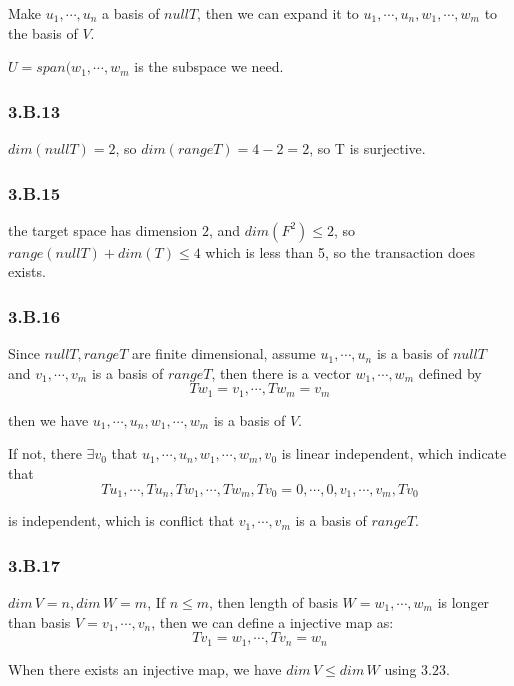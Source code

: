 Make $u_{1}, \cdots, u_{n}$ a basis of $null T$, then we can expand it to $u_{1}, \cdots, u_{n}, w_{1}, \cdots, w_{m}$ to the basis of $V$.

$U=span(w_{1},\cdots, w_{m}$ is the subspace we need.

\subsubsection*{3.B.13}

$dim(null T) = 2$, so $dim(range T) = 4 - 2 = 2$, so T is surjective.

\subsubsection*{3.B.15}

the target space has dimension $2$, and $dim(F^{2}) \leq 2$, so $range(null T) + dim(T) \leq 4$ which is less than 5, so the transaction does exists.

\subsubsection*{3.B.16}

Since $null T, range T$ are finite dimensional, assume $u_{1}, \cdots, u_{n}$ is a basis of $null T$ and $v_{1},\cdots, v_{m}$ is a basis of $range T$, then there is a vector $w_{1},\cdots,w_{m}$ defined by
\[Tw_{1} = v_{1}, \cdots, Tw_{m} = v_{m}\]

then we have $u_{1}, \cdots, u_{n}, w_{1}, \cdots, w_{m}$ is a basis of $V$. 

If not, there $\exists v_{0}$ that $u_{1}, \cdots, u_{n}, w_{1}, \cdots, w_{m}, v_{0}$ is linear independent, which indicate that
\[ Tu_{1}, \cdots, Tu_{n}, Tw_{1}, \cdots, Tw_{m}, Tv_{0} = 0, \cdots, 0, v_{1}, \cdots, v_{m}, Tv_{0}\] 

is independent, which is conflict that $v_{1},\cdots, v_{m}$ is a basis of $range T$.

\subsubsection*{3.B.17}

$dim\, V = n, dim\, W = m$, If $n \leq m$, then length of basis $W=w_{1},\cdots,w_{m}$ is longer than basis $V=v_{1},\cdots,v_{n}$, then we can define a injective map as:
\[Tv_{1} = w_{1}, \cdots, Tv_{n} = w_{n}\]

When there exists an injective map, we have $dim\,V\leq dim\,W$ using $3.23$.

